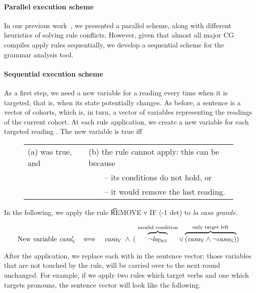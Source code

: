 \paragraph{Parallel execution scheme}
In our previous work~\cite{listenmaa_claessen2015,listenmaa2016lic}, we
presented a parallel scheme, along with different heuristics of
solving rule conflicts. However, given that almost all major CG
compiles apply rules sequentially, we develop a sequential scheme for the
grammar analysis tool.


\paragraph{Sequential execution scheme}

As a first step, we need a new variable for a reading every time when
it is targeted; that is, when its state potentially changes.
As before, a sentence is a vector of cohorts, which is, in turn, a
vector of variables representing the readings of the current cohort.
At each rule application, we create a new variable \newVar{} for each
targeted reading \oldVar{}.  The new variable \newVar{} is true iff

\begin{figure}[h]
\begin{tabular}{l l}
(a) \oldVar{} was true, and 
                             & (b) the rule cannot apply: this can be because \\
                                     & ~~~~-- its conditions do not hold, or \\
                                     & ~~~~-- it would remove the last reading.
\end{tabular}
\end{figure}

\noindent In the following, we apply the rule \t{REMOVE v IF (-1 det)} to {\em la casa grande}.

$$\begin{array}{r l}
\text{New variable } \casa{}'_\v 
      & \Longleftrightarrow \quad \casaV\ 
        \wedge\: ( \; \ob{\neg\laDet}^{\invConds} 
        \vee  \ob{(\casaV \wedge \neg \casaN) }^{\onlyTrgLeft} ) \\
\end{array}$$

\noindent After the application, we replace each \oldVar with \newVar
in the sentence vector; those variables that are not touched by the
rule, will be carried over to the next round unchanged. For example,
if we apply two rules which target verbs and one which targets
pronouns, the sentence vector will look like the following.


